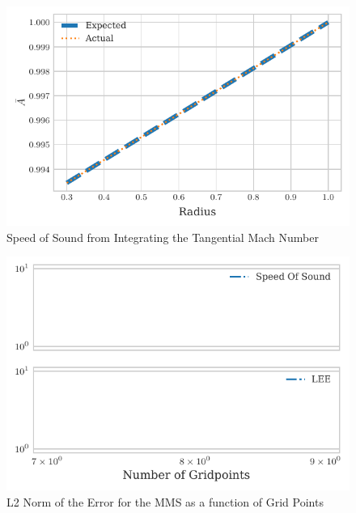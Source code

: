 \documentclass[12pt]{uthesis-v12}  %
\begin{document}
 \begin{figure}
     \centering
         \includegraphics[width=\textwidth]{Chapter-5-Results/tex-outputs/SoundSpeedFromIntegration_R1.pdf}
     \caption{Speed of Sound from Integrating the Tangential Mach Number}
 \end{figure}

 \begin{figure}
     \centering
         \includegraphics[width=\textwidth]{Chapter-5-Results/tex-outputs/L2_R1.pdf}
     \caption{L2 Norm of the Error for the MMS as a function of Grid Points}
 \end{figure}
\end{document}
